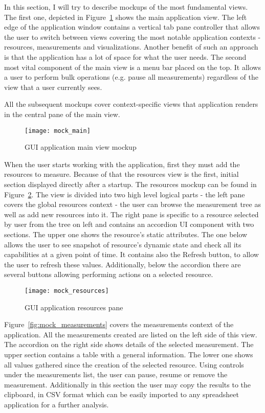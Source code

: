 In this section, I will try to describe mockups of the most fundamental views. The first one, depicted in Figure~\ref{fig:mock_main} shows the main application view. The left edge of the application window contains a vertical tab pane controller that allows the user to switch between views covering the most notable application contexts - resources, measurements and visualizations. Another benefit of such an approach is that the application has a lot of space for what the user needs. The second most vital component of the main view is a menu bar placed on the top. It allows a user to perform bulk operations (e.g. pause all measurements) regardless of the view that a user currently sees.

All the subsequent mockups cover context-specific views that application renders in the central pane of the main view.

\begin{figure}[ht]
\centering
\texttt{[image: mock\_main]}
\caption{GUI application main view mockup}
\label{fig:mock_main}
\end{figure}

When the user starts working with the application, first they must add the resources to measure. Because of that the resources view is the first, initial section displayed directly after a startup. The resources mockup can be found in Figure~\ref{fig:mock_resources}. The view is divided into two high level logical parts - the left pane covers the global resources context - the user can browse the measurement tree as well as add new resources into it. The right pane is specific to a resource selected by user from the tree on left and contains an accordion UI component with two sections. The upper one shows the resource\rq{}s static attributes. The one below allows the user to see snapshot of resource\rq{}s dynamic state and check all its capabilities at a given point of time. It contains also the Refresh button, to allow the user to refresh these values. Additionally, below the accordion there are several buttons allowing performing actions on a selected resource.

\begin{figure}[ht]
\centering
\texttt{[image: mock\_resources]}
\caption{GUI application resources pane}
\label{fig:mock_resources}
\end{figure}

Figure~\ref{fig:mock_measurements} covers the measurements context of the application. All the measurements created are listed on the left side of this view. The accordion on the right side shows details of the selected measurement. The upper section contains a table with a general information. The lower one shows all values gathered since the creation of the selected resource. Using controls under the measurements list, the user can pause, resume or remove the measurement. Additionally in this section the user may copy the results to the clipboard, in CSV format which can be easily imported to any spreadsheet application for a further analysis.

